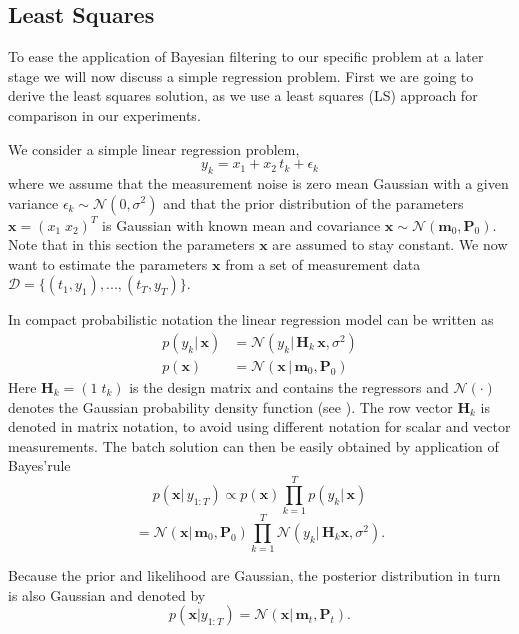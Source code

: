 \subsection{Least Squares}
To ease the application of Bayesian filtering to our specific problem
at a later stage we will now discuss a simple regression problem.
First we are going to derive the least squares solution, as
we use a least squares (LS) approach for comparison in our experiments.

We consider a simple linear regression problem,
\begin{equation}
  \label{regression_problem}
  y_k = x_1 + x_2 \, t_k + \epsilon_k
\end{equation}
where we assume that the measurement noise is zero mean Gaussian with
a given variance $\epsilon_k \sim \mathcal{N}(0, \sigma^2)$ and that the
prior distribution of the
parameters $\mathbf{x} = (x_{1} \; x_{2})^T$ is
Gaussian with known mean and covariance
$\mathbf{x} \sim \mathcal{N}(\mathbf{m}_0, \mathbf{P}_0)$. Note that
in this section the parameters $\mathbf{x}$ are assumed to stay constant.
We now want to estimate
the parameters $\mathbf{x}$ from a set of measurement
data $\mathcal{D} = \{(t_1, y_1),...,(t_T, y_T)\}$.

In compact probabilistic notation the linear regression model
can be written as
\begin{equation}
  \label{regression_model_1}
  \begin{aligned}
    p(y_k |\, \mathbf{x}) &= \mathcal{N}(y_k |\, \mathbf{H}_k \, \mathbf{x}, \sigma^2) \\
    p(\mathbf{x}) &= \mathcal{N}(\mathbf{x} \, |\,
    \mathbf{m}_0, \mathbf{P}_0)
  \end{aligned}
\end{equation}
Here $\mathbf{H}_k = (1 \;t_k)$ is the design matrix and
contains the regressors and $\mathcal{N}(\cdot)$ denotes
the Gaussian probability density
function (see ). The row vector $\mathbf{H}_k$ is denoted
in matrix notation, to avoid using different notation for scalar
and vector measurements.
The batch solution can then be easily obtained by application of Bayes'rule
$$ p(\mathbf{x} | \, y_{1:T})
\propto p(\mathbf{x}) \prod^T_{k=1} p (y_k | \, \mathbf{x}) $$
$$ = \mathcal{N}(\mathbf{x} | \, \mathbf{m}_0, \mathbf{P}_0)
\prod^T_{k=1} \mathcal{N}(y_k |\, \textbf{H}_k \mathbf{x}, \sigma^2). $$

Because the prior and likelihood are Gaussian, the posterior distribution
in turn is also Gaussian and denoted by
$$ p(\mathbf{x} | y_{1:T}) = \mathcal{N}(\mathbf{x} | \,
\mathbf{m}_t, \mathbf{P}_t). $$

